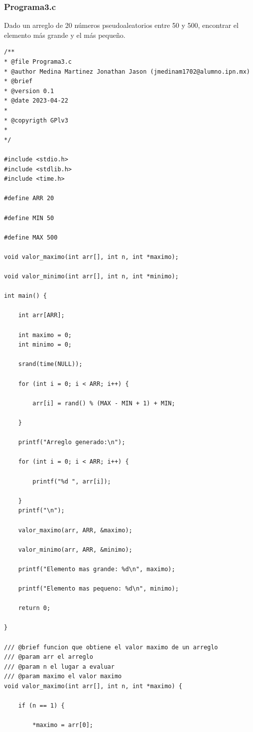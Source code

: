 \documentclass{article}
\begin{document}
	\subsubsection{Programa3.c}
	
	Dado un arreglo de 20 números pseudoaleatorios entre 50 y 500, encontrar el elemento más grande y el más pequeño.
	
	\begin{lstlisting}
/**
* @file Programa3.c
* @author Medina Martinez Jonathan Jason (jmedinam1702@alumno.ipn.mx)
* @brief 
* @version 0.1
* @date 2023-04-22
* 
* @copyrigth GPlv3
* 
*/

#include <stdio.h>
#include <stdlib.h>
#include <time.h>

#define ARR 20

#define MIN 50

#define MAX 500

void valor_maximo(int arr[], int n, int *maximo);

void valor_minimo(int arr[], int n, int *minimo);

int main() {
	
	int arr[ARR];
	
	int maximo = 0;
	int minimo = 0;
	
	srand(time(NULL));
	
	for (int i = 0; i < ARR; i++) {

		arr[i] = rand() % (MAX - MIN + 1) + MIN;

	}
	
	printf("Arreglo generado:\n");
	
	for (int i = 0; i < ARR; i++) {
		
		printf("%d ", arr[i]);
		
	}
	printf("\n");
	
	valor_maximo(arr, ARR, &maximo);
	
	valor_minimo(arr, ARR, &minimo);
	
	printf("Elemento mas grande: %d\n", maximo);
	
	printf("Elemento mas pequeno: %d\n", minimo);
	
	return 0;
	
}

/// @brief funcion que obtiene el valor maximo de un arreglo
/// @param arr el arreglo
/// @param n el lugar a evaluar
/// @param maximo el valor maximo
void valor_maximo(int arr[], int n, int *maximo) {
	
	if (n == 1) {
		
		*maximo = arr[0];
		

\end{lstlisting}
\end{document}
